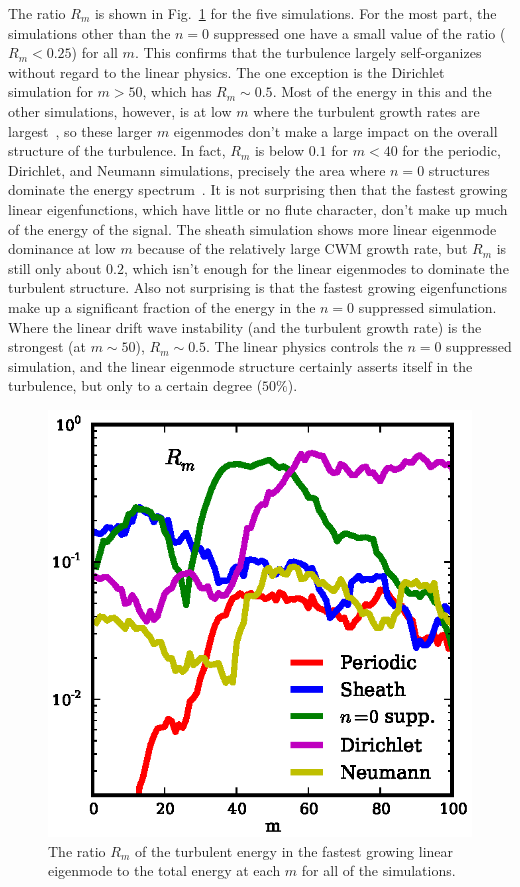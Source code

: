 \documentclass[showpacs,preprintnumbers,amsmath,amssymb,superscriptaddress,aip]{revtex4-1}
\begin{document}
The ratio $R_m$ is shown in Fig.~\ref{ratios} for the five simulations. For the most part, the simulations other than the $n=0$ suppressed one have a small value of the ratio ($R_m < 0.25$) for all $m$. 
This confirms that the turbulence largely self-organizes
without regard to the linear physics. The one exception is the Dirichlet simulation for $m > 50$, which has $R_m \sim 0.5$. Most of the energy in this and the other simulations, however, 
is at low $m$ where the turbulent growth rates are largest~\cite{friedman2012b},
so these larger $m$ eigenmodes don't make a large impact on the overall structure of the turbulence.
In fact, $R_m$ is below $0.1$ for $m<40$ for the periodic, Dirichlet, and Neumann simulations, precisely the area where
$n=0$ structures dominate the energy spectrum~\cite{friedman2012b}. It is not surprising then that the fastest growing linear eigenfunctions, which have little or no flute character,
don't make up much of the energy of the signal. The sheath simulation shows more linear eigenmode dominance at low $m$ because of the relatively large CWM growth rate, but $R_m$ is still only
about $0.2$, which isn't enough for the linear eigenmodes to dominate the turbulent structure.
Also not surprising is that the fastest growing eigenfunctions make up a significant fraction of the energy in the $n=0$ suppressed simulation. Where the linear drift wave instability 
(and the turbulent growth rate) is the strongest (at $m \sim 50$), $R_m \sim 0.5$. The linear physics controls the $n=0$ suppressed simulation, and the linear eigenmode structure certainly asserts itself
in the turbulence, but only to a certain degree ($50\%$).

\begin{figure}[!htbp]
\includegraphics[]{ratios}
\hfil
\caption{The ratio $R_m$ of the turbulent energy in the fastest growing linear eigenmode to the total energy at each $m$ for all of the simulations.}
\label{ratios}
\end{figure}
\end{document}
